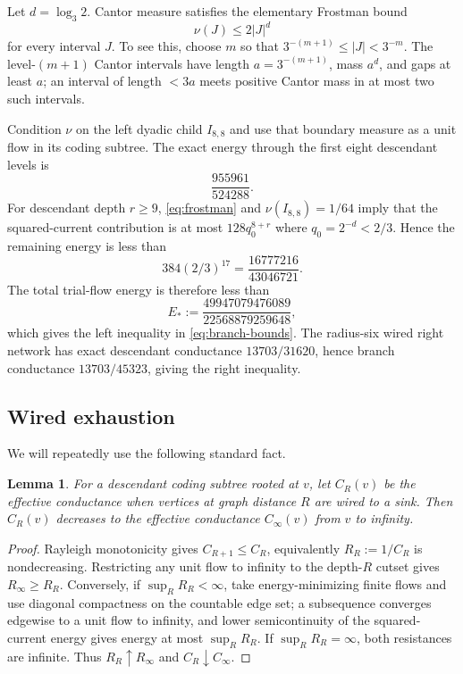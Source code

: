 \documentclass[11pt]{article}
\newtheorem{lemma}[theorem]{Lemma}
\theoremstyle{remark}
\begin{document}
Let $d=\log_3 2$.  Cantor measure satisfies the elementary Frostman bound
\begin{equation}\label{eq:frostman}
 \nu(J)\le2|J|^d
\end{equation}
for every interval $J$.  To see this, choose $m$ so that $3^{-(m+1)}\le|J|<3^{-m}$.  The level-$(m+1)$ Cantor intervals have length $a=3^{-(m+1)}$, mass $a^d$, and gaps at least $a$; an interval of length $<3a$ meets positive Cantor mass in at most two such intervals.

Condition $\nu$ on the left dyadic child $I_{8,8}$ and use that boundary measure as a unit flow in its coding subtree.  The exact energy through the first eight descendant levels is
\[
 \frac{955961}{524288}.
\]
For descendant depth $r\ge9$, \eqref{eq:frostman} and $\nu(I_{8,8})=1/64$ imply that the squared-current contribution is at most $128q_0^{8+r}$ where $q_0=2^{-d}<2/3$.  Hence the remaining energy is less than
\[
 384(2/3)^{17}=\frac{16777216}{43046721}.
\]
The total trial-flow energy is therefore less than
\[
 E_*:=\frac{49947079476089}{22568879259648},
\]
which gives the left inequality in \eqref{eq:branch-bounds}.  The radius-six wired right network has exact descendant conductance $13703/31620$, hence branch conductance $13703/45323$, giving the right inequality.

\subsection{Wired exhaustion}

We will repeatedly use the following standard fact.

\begin{lemma}\label{lem:wired}
For a descendant coding subtree rooted at $v$, let $C_R(v)$ be the effective conductance when vertices at graph distance $R$ are wired to a sink.  Then $C_R(v)$ decreases to the effective conductance $C_\infty(v)$ from $v$ to infinity.
\end{lemma}

\begin{proof}
Rayleigh monotonicity gives $C_{R+1}\le C_R$, equivalently $R_R:=1/C_R$ is nondecreasing.  Restricting any unit flow to infinity to the depth-$R$ cutset gives $R_\infty\ge R_R$.  Conversely, if $\sup_RR_R<\infty$, take energy-minimizing finite flows and use diagonal compactness on the countable edge set; a subsequence converges edgewise to a unit flow to infinity, and lower semicontinuity of the squared-current energy gives energy at most $\sup_RR_R$.  If $\sup_RR_R=\infty$, both resistances are infinite.  Thus $R_R\uparrow R_\infty$ and $C_R\downarrow C_\infty$.
\end{proof}
\end{document}
